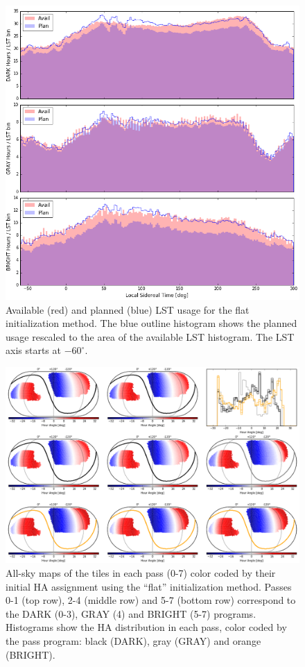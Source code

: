 \documentclass[12pt]{article}
\begin{document}
\begin{figure}[htb]
\begin{center}
\includegraphics[width=6in]{LST_flat0}
\caption{Available (red) and planned (blue) LST usage for the flat initialization method.  The blue outline histogram shows the planned usage rescaled to the area of the available LST histogram.  The LST axis starts at $-60^\circ$.}
\label{fig:LST_flat0}
\end{center}
\end{figure}

\begin{figure}[htb]
\begin{center}
\includegraphics[width=6in]{HA_flat0}
\caption{All-sky maps of the tiles in each pass (0-7) color coded by their initial HA assignment using the ``flat'' initialization method.  Passes 0-1 (top row), 2-4 (middle row) and 5-7 (bottom row) correspond to the DARK (0-3), GRAY (4) and BRIGHT (5-7) programs.  Histograms show the HA distribution in each pass, color coded by the pass program: black (DARK), gray (GRAY) and orange (BRIGHT).}
\label{fig:HA_flat0}
\end{center}
\end{figure}
\end{document}
